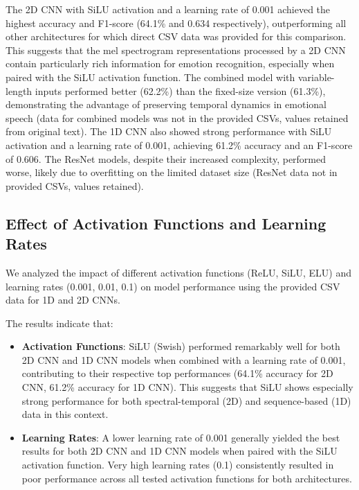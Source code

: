 The 2D CNN with SiLU activation and a learning rate of 0.001 achieved the highest accuracy and F1-score (64.1\% and 0.634 respectively), outperforming all other architectures for which direct CSV data was provided for this comparison. This suggests that the mel spectrogram representations processed by a 2D CNN contain particularly rich information for emotion recognition, especially when paired with the SiLU activation function. The combined model with variable-length inputs performed better (62.2\%) than the fixed-size version (61.3\%), demonstrating the advantage of preserving temporal dynamics in emotional speech (data for combined models was not in the provided CSVs, values retained from original text). The 1D CNN also showed strong performance with SiLU activation and a learning rate of 0.001, achieving 61.2\% accuracy and an F1-score of 0.606. The ResNet models, despite their increased complexity, performed worse, likely due to overfitting on the limited dataset size (ResNet data not in provided CSVs, values retained).

\subsection{Effect of Activation Functions and Learning Rates}

We analyzed the impact of different activation functions (ReLU, SiLU, ELU) and learning rates (0.001, 0.01, 0.1) on model performance using the provided CSV data for 1D and 2D CNNs.

The results indicate that:

\begin{itemize}
    \item \textbf{Activation Functions}: SiLU (Swish) performed remarkably well for both 2D CNN and 1D CNN models when combined with a learning rate of 0.001, contributing to their respective top performances (64.1\% accuracy for 2D CNN, 61.2\% accuracy for 1D CNN). This suggests that SiLU shows especially strong performance for both spectral-temporal (2D) and sequence-based (1D) data in this context.
    
    \item \textbf{Learning Rates}: A lower learning rate of 0.001 generally yielded the best results for both 2D CNN and 1D CNN models when paired with the SiLU activation function. Very high learning rates (0.1) consistently resulted in poor performance across all tested activation functions for both architectures.
\end{itemize}

